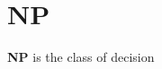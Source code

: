 \section{NP}
\begin{frame}
	\begin{definition}
		\textbf{NP} is the class of decision
	\end{definition}
\end{frame}